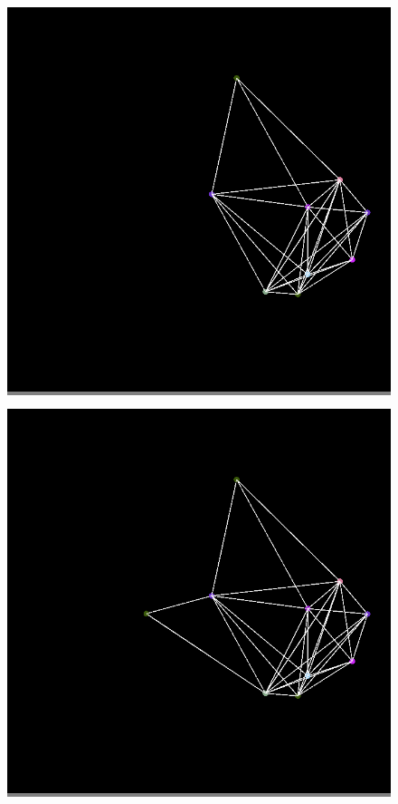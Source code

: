 \documentclass{article}
\begin{document}
\begin{figure}
\begin{minipage}{0.2\textwidth}
            \end{minipage}
            \vskip 0.1in
            \begin{minipage}{0.2\textwidth}
            \colorbox{gray}{\includegraphics[width=\linewidth]{./images/color-9.png}}
            \end{minipage}
            \hspace{\fill}
            \begin{minipage}{0.2\textwidth}
            \colorbox{gray}{\includegraphics[width=\linewidth]{./images/color-10.png}}

\end{minipage}
\end{figure}
\end{document}

